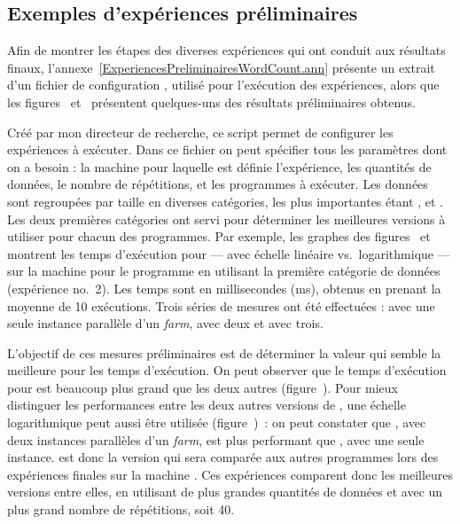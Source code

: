 \subsection{Exemples d'expériences préliminaires}


Afin de montrer les \'etapes des diverses exp\'eriences qui ont conduit aux r\'esultats finaux, l'annexe~\ref{ExperiencesPreliminairesWordCount.ann} pr\'esente un extrait d'un fichier de configuration , utilis\'e pour l'ex\'ecution des expériences, alors que les figures~ et~ présentent quelques-uns des r\'esultats préliminaires obtenus.

Cr\'e\'e par mon directeur de recherche, ce script permet de configurer les expériences \`a ex\'ecuter. Dans ce fichier on peut sp\'ecifier tous les param\`etres dont on a besoin : la machine pour laquelle est définie l'expérience, les quantités de donn\'ees, le nombre de r\'ep\'etitions, et les programmes \`a ex\'ecuter. Les donn\'ees sont regroup\'ees par taille en diverses cat\'egories, les plus importantes étant ,  et . Les deux premi\`eres cat\'egories ont servi pour d\'eterminer les meilleures versions \`a utiliser pour chacun des programmes. Par exemple, les graphes des figures~ et~ montrent les temps d'ex\'ecution pour  --- avec échelle linéaire vs.\ logarithmique --- sur la machine  pour le programme  en utilisant la premi\`ere cat\'egorie de donn\'ees (expérience no.~2). Les temps sont en millisecondes (ms), obtenus en prenant la moyenne de 10 ex\'ecutions.  Trois  s\'eries de mesures ont \'et\'e effectu\'ees :  avec une seule instance parallèle d'un \emph{farm},  avec deux et  avec trois.


L'objectif de ces mesures pr\'eliminaires est de d\'eterminer la valeur qui semble la meilleure pour les temps d'ex\'ecution. On peut observer que le temps d'ex\'ecution pour  est beaucoup plus grand que les deux autres (figure~).
%
Pour mieux distinguer les performances entre les deux autres versions de , une échelle logarithmique peut aussi être utilis\'ee (figure~)~: on peut constater que , avec deux instances parall\`eles d'un \emph{farm}, est plus performant que , avec une seule instance. 
%
 est donc la version qui sera compar\'ee aux autres programmes lors des expériences finales sur la machine . Ces expériences comparent donc les meilleures versions entre elles, en utilisant de plus grandes quantit\'es de donn\'ees et avec un plus grand nombre de r\'ep\'etitions, soit 40.



